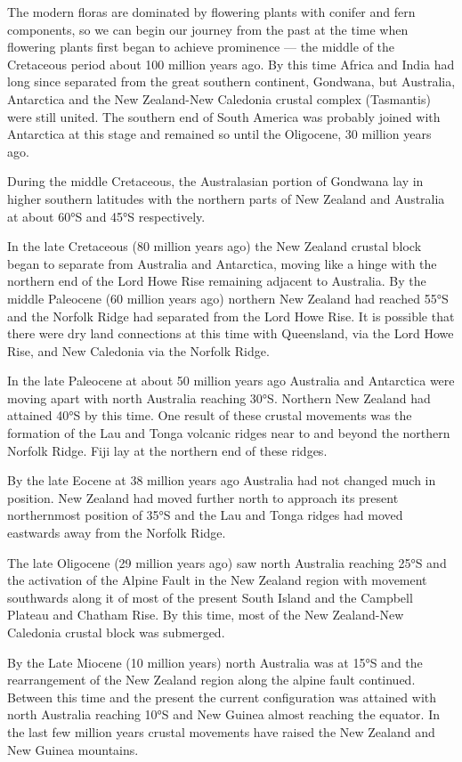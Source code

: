 The modern floras are dominated by flowering plants with conifer and fern components, so we can begin our journey from the past at the time when flowering plants first began to achieve prominence --- the middle of the Cretaceous period about 100 million years ago.
By this time Africa and India had long since separated from the great southern continent, Gondwana, but Australia, Antarctica and the New Zealand-New Caledonia crustal complex (Tasmantis) were still united.
The southern end of South America was probably joined with Antarctica at this stage and remained so until the Oligocene, 30 million years ago.

During the middle Cretaceous, the Australasian portion of Gondwana lay in higher southern latitudes with the northern parts of New Zealand and Australia at about \ang{60}S and \ang{45}S respectively.

In the late Cretaceous (80 million years ago) the New Zealand crustal block began to separate from Australia and Antarctica, moving like a hinge with the northern end of the Lord Howe Rise remaining adjacent to Australia.
By the middle Paleocene (60 million years ago) northern New Zealand had reached \ang{55}S and the Norfolk Ridge had separated from the Lord Howe Rise.
It is possible that there were dry land connections at this time with Queensland, via the Lord Howe Rise, and New Caledonia via the Norfolk Ridge.

In the late Paleocene at about 50 million years ago Australia and Antarctica were moving apart with north Australia reaching \ang{30}S.
Northern New Zealand had attained \ang{40}S by this time.
One result of these crustal movements was the formation of the Lau and Tonga volcanic ridges near to and beyond the northern Norfolk Ridge.
Fiji lay at the northern end of these ridges.

By the late Eocene at 38 million years ago Australia had not changed much in position.
New Zealand had moved further north to approach its present northernmost position of \ang{35}S and the Lau and Tonga ridges had moved eastwards away from the Norfolk Ridge.

The late Oligocene (29 million years ago) saw north Australia reaching \ang{25}S and the activation of the Alpine Fault in the New Zealand region with movement southwards along it of most of the present South Island and the Campbell Plateau and Chatham Rise.
By this time, most of the New Zealand-New Caledonia crustal block was submerged.

By the Late Miocene (10 million years) north Australia was at \ang{15}S and the rearrangement of the New Zealand region along the alpine fault continued.
Between this time and the present the current configuration was attained with north Australia reaching \ang{10}S and New Guinea almost reaching the equator.
In the last few million years crustal movements have raised the New Zealand and New Guinea mountains.

